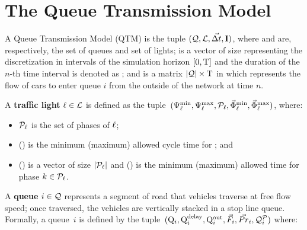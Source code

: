 \section{The Queue Transmission Model}



A Queue Transmission Model (QTM) is the tuple $(\mathcal{Q}, \mathcal{L}, \vec{\Delta t}, \mathbf{I})$,
where \Qset and \Lset are, respectively, the set of queues and set of lights;
%
\vecDT is a vector of size \Nn representing the discretization in intervals of
the simulation horizon $[0,\mathrm{T}]$ and the duration  of the
$n$-th time interval is denoted as \DT[n];
%
%
and \MatQIN is a matrix $|\mathcal{Q}| \times \mathrm{T}$ in which  represents the
flow of cars  to enter queue $i$ from the outside of the network
at time $n$.



A \textbf{traffic light} $\ell \in \mathcal{L}$ is defined as the tuple~$(\mathrm{\Psi}_{\ell}^{\mathrm{min}},
\mathrm{\Psi}_{\ell}^{\mathrm{max}}, \mathcal{P}_\ell, \vec{\mathrm{\Phi}}_{\ell}^{\mathrm{min}}, \vec{\mathrm{\Phi}}_{\ell}^{\mathrm{max}})$, where:

\begin{itemize}
%
\item $\mathcal{P}_\ell$ is the set of phases of $\ell$;
%
\item \CTMIN{\tl} (\CTMAX{\tl}) is the minimum (maximum) allowed cycle time for
  \tl; and
%
\item \VecPTMIN{\tl} (\VecPTMAX{\tl}) is a vector of size $|\mathcal{P}_\ell|$ and
   () is the minimum (maximum) allowed time for
  phase $k \in \mathcal{P}_\ell$. 
%
\end{itemize}


A \textbf{queue} $i \in \mathcal{Q}$ represents a segment of road that vehicles
traverse at free flow speed; once traversed, the vehicles are vertically stacked
in a stop line queue.
%
Formally, a queue~$i$ is defined by the tuple~$(\mathrm{Q}_{i}, \mathrm{Q}_{i}^{\mathrm{delay}}, \mathrm{Q}_{i}^{\mathrm{out}},
\vec{F}_i, \vec{Pr}_i, \mathcal{Q}_{i}^{\mathcal{P}})$ where:


